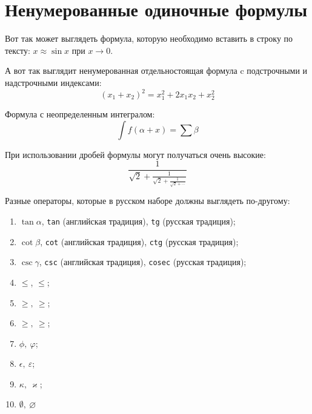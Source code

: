 \documentclass[12pt]{extreport}
\begin{document}
\section{Ненумерованные одиночные формулы}
\label{subsec:ch1/sec3/sub1}
Вот так может выглядеть формула, которую необходимо вставить в строку по тексту: \(x \approx \sin x\) при \(x \to 0\).

А вот так выглядит ненумерованная отдельностоящая формула c подстрочными и надстрочными индексами:
\[(x_1+x_2)^2 = x_1^2 + 2 x_1 x_2 + x_2^2\]

Формула с неопределенным интегралом:
\[\int f(\alpha+x)=\sum\beta\]

При использовании дробей формулы могут получаться очень высокие:
\[\frac{1}{\sqrt{2}+
        \displaystyle\frac{1}{\sqrt{2}+
            \displaystyle\frac{1}{\sqrt{2}+\cdots}}}\]

Разные операторы, которые в русском наборе должны выглядеть по-другому:
\begin{enumerate}
\item \(\tan\alpha\), \texttt{tan} (английская традиция), \texttt{tg} (русская традиция);
\item \(\cot\beta\), \texttt{cot} (английская традиция), \texttt{ctg} (русская традиция);
\item \(\csc\gamma\), \texttt{csc} (английская традиция), \texttt{cosec} (русская традиция);
\item \(\le\), \(\leqslant\);
\item \(\ge,\ \geqslant\);
\item \(\geq,\ \geqslant\);
\item \(\phi,\ \varphi\);
\item \(\epsilon,\ \varepsilon\);
\item \(\kappa,\ \varkappa\);
\item \(\emptyset,\ \varnothing\)
\end{enumerate}
\end{document}
